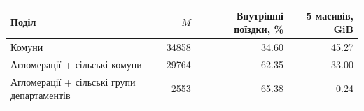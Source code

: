 \begin{tabularx}{\linewidth}{Xrrr}\toprule
Поділ & $M$ & Внутрішні поїздки, \% & 5 масивів, GiB\\\midrule
Комуни & 34858 & 34.60 & 45.27\\
Агломерації + сільські комуни & 29764 & 62.35 & 33.00\\
Агломерації + сільські групи департаментів & 2553 & 65.38 & 0.24\\
\bottomrule\end{tabularx}
